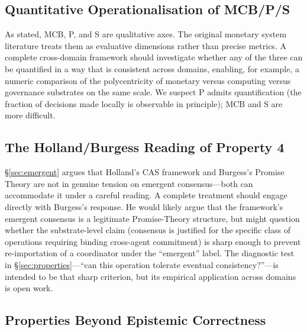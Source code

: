 \documentclass[11pt]{article}
\theoremstyle{definition}
\theoremstyle{plain}
\theoremstyle{plain}
\begin{document}
\subsection{Quantitative Operationalisation of MCB/P/S}

As stated, MCB, P, and S are qualitative axes. The original monetary system
literature treats them as evaluative dimensions rather than precise metrics.
A complete cross-domain framework should investigate whether any of the three
can be quantified in a way that is consistent across domains, enabling, for
example, a numeric comparison of the polycentricity of monetary versus
computing versus governance substrates on the same scale. We suspect P admits
quantification (the fraction of decisions made locally is observable in
principle); MCB and S are more difficult.

\subsection{The Holland/Burgess Reading of Property 4}

\S\ref{sec:emergent} argues that Holland's CAS framework and Burgess's
Promise Theory are not in genuine tension on emergent consensus---both can
accommodate it under a careful reading. A complete treatment should engage
directly with Burgess's response. He would likely argue that the framework's
emergent consensus is a legitimate Promise-Theory structure, but might
question whether the substrate-level claim (consensus is justified for the
specific class of operations requiring binding cross-agent commitment) is
sharp enough to prevent re-importation of a coordinator under the
``emergent'' label. The diagnostic test in \S\ref{sec:properties}---``can
this operation tolerate eventual consistency?''---is intended to be that
sharp criterion, but its empirical application across domains is open work.

\subsection{Properties Beyond Epistemic Correctness}
\end{document}
